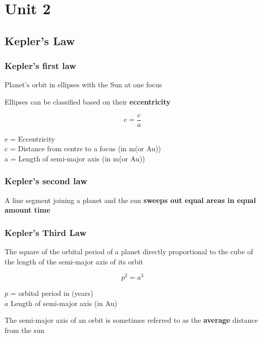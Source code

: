 \chapter{Unit 2}
\section{Kepler's Law}

\subsection{Kepler's first law}
\begin{definition}
    Planet's orbit in ellipses with the Sun at one focus
\end{definition}

Ellipses can be classified based on their \textbf{eccentricity}

\[
    e = \frac{c}{a}
\]

\begin{center}
    e = Eccentricity \\
    c = Distance from centre to a focus (in m(or Au))\\
    a = Length of semi-major axis (in m(or Au))
\end{center}

\subsection{Kepler's second law}
\begin{definition}
    A line segment joining a planet and the sun \textbf{sweeps out equal areas in equal amount time}
\end{definition}

\subsection{Kepler's Third Law}
\begin{definition}
    The square of the orbital period of a planet directly proportional to the cube of the length 
    of the semi-major axis of its orbit
\end{definition}

\[
    p^2 = a^3
\]
\begin{center}
    $p$ = orbital period in (years)\\
    $a$ Length of semi-major axis (in Au)
\end{center}

The semi-major axis of an orbit is sometimes referred to as the \textbf{average} distance from the sun